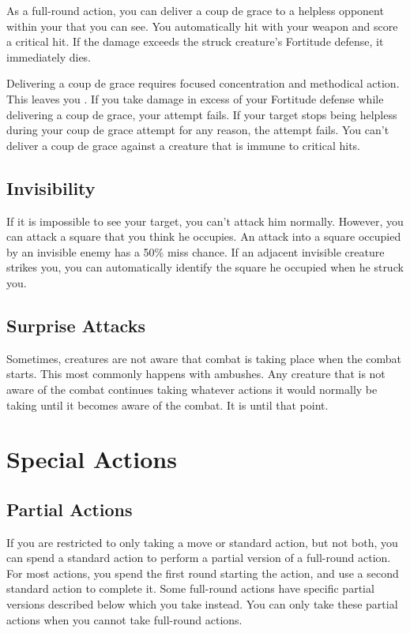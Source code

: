         \label{Coup de Grace} As a full-round action, you can deliver a coup de grace to a helpless opponent within your  that you can see.
        You automatically hit with your weapon and score a critical hit. If the damage exceeds the struck creature's Fortitude defense, it immediately dies.

        Delivering a coup de grace requires focused concentration and methodical action. This leaves you . If you take damage in excess of your Fortitude defense while delivering a coup de grace, your attempt fails.
        If your target stops being helpless during your coup de grace attempt for any reason, the attempt fails.
        You can't deliver a coup de grace against a creature that is immune to critical hits.

    \subsection{Invisibility}\label{Invisibility}
        If it is impossible to see your target, you can't attack him normally. However, you can attack a square that you think he occupies. An attack into a square occupied by an invisible enemy has a 50\% miss chance. If an adjacent invisible creature strikes you, you can automatically identify the square he occupied when he struck you.

    \subsection{Surprise Attacks}\label{Surprise Attacks}
        Sometimes, creatures are not aware that combat is taking place when the combat starts. This most commonly happens with ambushes. Any creature that is not aware of the combat continues taking whatever actions it would normally be taking until it becomes aware of the combat. It is \unaware until that point.

\section{Special Actions}

    \subsection{Partial Actions}

        If you are restricted to only taking a move or standard action, but not both, you can spend a standard action to perform a partial version of a full-round action. For most actions, you spend the first round starting the action, and use a second standard action to complete it. Some full-round actions have specific partial versions described below which you take instead. You can only take these partial actions when you cannot take full-round actions.

